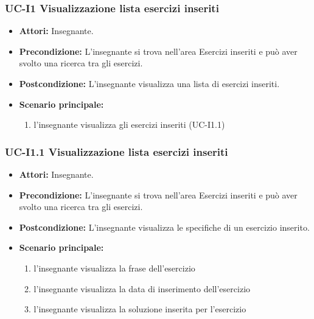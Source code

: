 \subsubsection{UC-I1 Visualizzazione lista esercizi inseriti}
\begin{itemize}
\item \textbf{Attori: }Insegnante.
		\item \textbf{Precondizione: }L'insegnante si trova nell'area Esercizi inseriti e può aver svolto una ricerca tra gli esercizi.
		\item \textbf{Postcondizione: }L'insegnante visualizza una lista di esercizi inseriti. 
		\item \textbf{Scenario principale:}
		\begin{enumerate}
			\item l'insegnante visualizza gli esercizi inseriti (UC-I1.1)
		\end{enumerate}
	\end{itemize}

\subsubsection{UC-I1.1 Visualizzazione lista esercizi inseriti}
\begin{itemize}
\item \textbf{Attori: }Insegnante.
		\item \textbf{Precondizione: }L'insegnante si trova nell'area Esercizi inseriti e può aver svolto una ricerca tra gli esercizi.
		\item \textbf{Postcondizione: }L'insegnante visualizza le specifiche di un esercizio inserito. 
		\item \textbf{Scenario principale:}
		\begin{enumerate}
			\item l'insegnante visualizza la frase dell'esercizio
			\item l'insegnante visualizza la data di inserimento dell'esercizio
			\item l'insegnante visualizza la soluzione inserita per l'esercizio
		\end{enumerate}
	\end{itemize}

